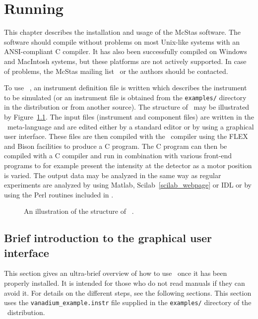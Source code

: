 
\chapter{Running \MCS}

This chapter describes the installation and usage of the McStas software.
The software should compile without problems on most Unix-like
systems with an ANSI-compliant C compiler. It has also been successfully
compiled on Windows and MacIntosh systems, but these platforms are
not actively supported. In case of problems, the McStas
mailing list~\cite{mcstas_webpage} or the authors should be contacted.

To use \MCS\ , an instrument
definition file is written which describes the instrument to be simulated (or
an instrument file is obtained from the \verb+examples/+ directory in the
distribution or from another source). 
The structure of \MCS\ may be illustrated by Figure~\ref{fig:structure}.
The input files (instrument and component files) are written in the \MCS\
meta-language and are edited either by a standard editor or by using a 
graphical user interface. These files are 
then compiled with
the \MCS\ compiler using the FLEX and Bison facilities to produce a C program. 
The C program can then be
compiled with a C compiler and run in combination with various front-end programs to for
example present the intensity at the detector as a motor position is varied.
The output data may be analyzed in the same way as regular experiments are analyzed
by using Matlab, Scilab~\ref{scilab_webpage} or IDL or by using the Perl routines included in \MCS .

\begin{figure}[th]
\begin{center}

\end{center}
\caption{An illustration of the structure of \MCS\ .}
\label{fig:structure}
\end{figure}

\section{Brief introduction to the graphical user interface}
\label{s:brief}

This section gives an ultra-brief overview of how to use \MCS\ once it
has been properly installed. It is intended for those who do not read
manuals if they can avoid it. For details on the different steps, see
the following sections. This section uses the
\verb+vanadium_example.instr+ file supplied in the \verb+examples/+
directory of the \MCS\ distribution. %


